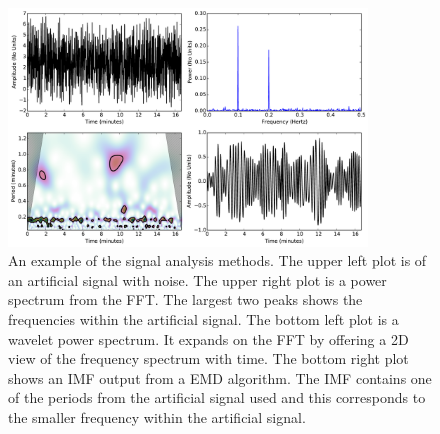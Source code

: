   	\begin{figure}
           \centering
           \includegraphics[width=0.85\textwidth]{signal_overview.pdf}
           \caption{
                   An example of the signal analysis methods. 
                   The upper left plot is of an artificial signal with noise.
                   The upper right plot is a power spectrum from the FFT.
                   The largest two peaks shows the frequencies within the artificial signal.
                   The bottom left plot is a wavelet power spectrum.
                   It expands on the FFT by offering a 2D view of the frequency spectrum with time.
                   The bottom right plot shows an IMF output from a EMD algorithm.
                   The IMF contains one of the periods from the artificial signal used and this corresponds to the smaller frequency within the artificial signal.
                   }
              \label{fig:signal_overview}
     \end{figure}
	
